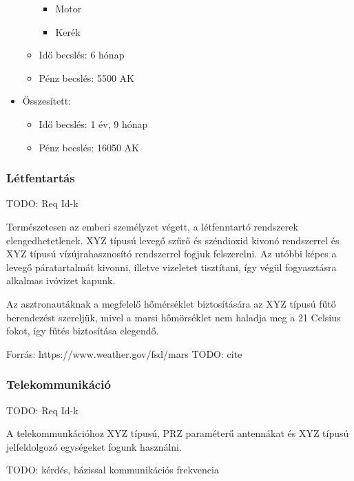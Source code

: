 \documentclass[12pt]{report}
\begin{document}
\begin{itemize}
\begin{itemize}
                \begin{itemize}
                    \item Motor
                    \item Kerék
                \end{itemize}
            \item Idő becslés: 6 hónap
            \item Pénz becslés: 5500 AK
        \end{itemize}
    \item Összesített:
        \begin{itemize}
            \item Idő becslés: 1 év, 9 hónap
            \item Pénz becslés: 16050 AK
        \end{itemize}
\end{itemize}

\subsubsection{Létfentartás}

TODO: Req Id-k

Természetesen az emberi személyzet végett, a létfenntartó rendszerek elengedhetetlenek. XYZ típusú levegő szűrő és széndioxid kivonó rendszerrel és XYZ típusú vízújrahasznosító rendszerrel fogjuk felszerelni. Az utóbbi képes a levegő páratartalmát kivonni, illetve vizeletet tisztítani, így végül fogyasztásra alkalmas ivóvizet kapunk.

Az asztronautáknak a megfelelő hőmérséklet biztosítására az XYZ típusú fűtő berendezést szereljük, mivel a marsi hőmörséklet nem haladja meg a 21 Celsius fokot, így fűtés biztosítása elegendő.

Forrás: https://www.weather.gov/fsd/mars
TODO: cite

\subsubsection{Telekommunikáció}

TODO: Req Id-k

A telekommunkációhoz XYZ típusú, PRZ paraméterű antennákat és XYZ típusú jelfeldolgozó egységeket fogunk használni.

TODO: kérdés, bázissal kommunikációs frekvencia
\end{document}
